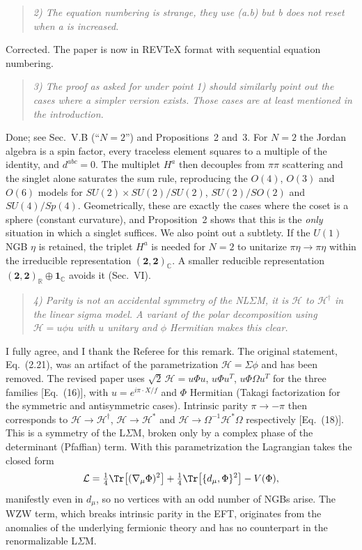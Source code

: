 \documentclass[11pt,a4paper]{article}
\newcommand{\referee}[1]{\begin{quote}\itshape\color{black!70}#1\end{quote}}
\newcommand{\Hf}{\mathcal{H}}
\begin{document}
\referee{2) The equation numbering is strange, they use (a.b) but b does not reset when a is increased.}

Corrected. The paper is now in REVTeX format with sequential equation numbering.

\referee{3) The proof as asked for under point 1) should similarly point out the cases where a simpler version exists. Those cases are at least mentioned in the introduction.}

Done; see Sec.~V.B (``$N=2$'') and Propositions~2 and~3. For $N=2$ the Jordan algebra is a spin factor, every traceless element squares to a multiple of the identity, and $d^{abc}=0$. The multiplet $H^a$ then decouples from $\pi\pi$ scattering and the singlet alone saturates the sum rule, reproducing the $O(4)$, $O(3)$ and $O(6)$ models for $SU(2)\times SU(2)/SU(2)$, $SU(2)/SO(2)$ and $SU(4)/Sp(4)$. Geometrically, these are exactly the cases where the coset is a sphere (constant curvature), and Proposition~2 shows that this is the \emph{only} situation in which a singlet suffices. We also point out a subtlety. If the $U(1)$ NGB $\eta$ is retained, the triplet $H^a$ is needed for $N=2$ to unitarize $\pi\eta\to\pi\eta$ within the irreducible representation $(\mathbf 2,\mathbf 2)_{\mathbb{C}}$. A smaller reducible representation $(\mathbf 2,\mathbf 2)_{\mathbb R}\oplus\mathbf 1_{\mathbb C}$ avoids it (Sec.~VI).

\referee{4) Parity is not an accidental symmetry of the NL$\Sigma$M, it is $\mathcal{H}$ to $\mathcal{H}^\dagger$ in the linear sigma model. A variant of the polar decomposition using $\mathcal{H}=u\phi u$ with $u$ unitary and $\phi$ Hermitian makes this clear.}

I fully agree, and I thank the Referee for this remark. The original statement, Eq.~(2.21), was an artifact of the parametrization $\Hf=\Sigma\phi$ and has been removed. The revised paper uses $\sqrt2\,\Hf=u\Phi u$, $u\Phi u^T$, $u\Phi\Omega u^T$ for the three families [Eq.~(16)], with $u=e^{i\pi\cdot X/f}$ and $\Phi$ Hermitian (Takagi factorization for the symmetric and antisymmetric cases). Intrinsic parity $\pi\to-\pi$ then corresponds to $\Hf\to\Hf^\dagger$, $\Hf\to\Hf^*$ and $\Hf\to\Omega^{-1}\Hf^*\Omega$ respectively [Eq.~(18)]. This is a symmetry of the L$\Sigma$M, broken only by a complex phase of the determinant (Pfaffian) term. With this parametrization the Lagrangian takes the closed form
\[
\mathcal{L}=\tfrac14\Tr\big[(\nabla_\mu\Phi)^2\big]+\tfrac14\Tr\big[\{d_\mu,\Phi\}^2\big]-V(\Phi),
\]
manifestly even in $d_\mu$, so no vertices with an odd number of NGBs arise. The WZW term, which breaks intrinsic parity in the EFT, originates from the anomalies of the underlying fermionic theory and has no counterpart in the renormalizable L$\Sigma$M.
\end{document}
